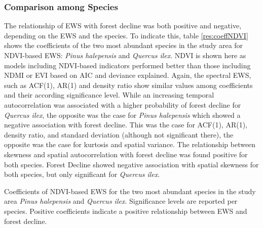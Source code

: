 \FloatBarrier

\subsubsection{Comparison among Species}
The relationship of EWS with forest decline was both positive and negative, depending on the EWS and the species. To indicate this, table \ref{res:coeffNDVI} shows the coefficients of the two most abundant species in the study area for NDVI-based EWS: \textit{Pinus halepensis} and \textit{Quercus ilex}. NDVI is shown here as models including NDVI-based indicators performed better than those including NDMI or EVI based on AIC and deviance explained. Again, the spectral EWS, such as ACF(1), AR(1) and density ratio show similar values among coefficients and their according significance level. While an increasing temporal autocorrelation was associated with a higher probability of forest decline for \textit{Quercus ilex}, the opposite was the case for \textit{Pinus halepensis} which showed a negative association with forest decline. This was the case for ACF(1), AR(1), density ratio, and standard deviation (although not significant there), the opposite was the case for kurtosis and spatial variance. The relationship between skewness and spatial autocorrelation with forest decline was found positive for both species. Forest Decline showed negative association with spatial skewness for both species, but only significant for \textit{Quercus ilex}.\\

\begin{table}[htp]
	\centering
	\caption{Coefficients of NDVI-based EWS for the two most abundant species in the study area \textit{Pinus halepensis} and \textit{Quercus ilex}. Significance levels are reported per species. Positive coefficients indicate a positive relationship between EWS and forest decline.}\label{res:coeffNDVI}
\end{table}




